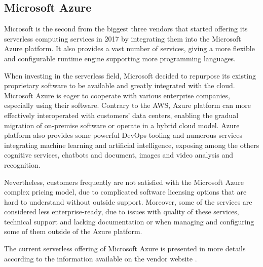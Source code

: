 \subsection{Microsoft Azure}

Microsoft is the second from the biggest three vendors that started offering its serverless computing services in 2017 by integrating them into the Microsoft Azure platform. It also provides a vast number of services, giving a more flexible and configurable runtime engine supporting more programming languages.

When investing in the serverless field, Microsoft decided to repurpose its existing proprietary software to be available and greatly integrated with the cloud. Microsoft Azure is eager to cooperate with various enterprise companies, especially using their software. Contrary to the AWS, Azure platform can more effectively interoperated with customers' data centers, enabling the gradual migration of on-premise software or operate in a hybrid cloud model. Azure platform also provides some powerful DevOps tooling and numerous services integrating machine learning and artificial intelligence, exposing among the others cognitive services, chatbots and document, images and video analysis and recognition.

Nevertheless, customers frequently are not satisfied with the Microsoft Azure complex pricing model, due to complicated software licensing options that are hard to understand without outside support. Moreover, some of the services are considered less enterprise-ready, due to issues with quality of these services, technical support and lacking documentation or when managing and configuring some of them outside of the Azure platform.

The current serverless offering of Microsoft Azure is presented in more details according to the information available on the vendor website \cite{AzureServerlessOffering}.


